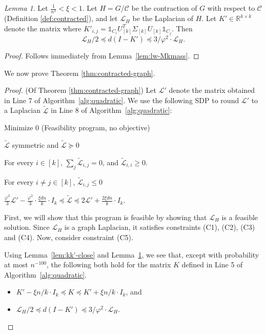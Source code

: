 \documentclass[letterpaper,11pt]{article}
\newcommand{\cC}{\mathcal{C}}
\newcommand{\cL}{\mathcal{L}}
\newcommand{\R}{\mathbb{R}}
\theoremstyle{plain}
\theoremstyle{definition}
\theoremstyle{remark}
\newtheorem{lemmma}{Lemma}
\newcommand{\wt}[1]{\widetilde{#1}}
\begin{document}
\begin{lemmma} \label{lem:k'-to-lh}
    Let $\frac{1}{n^4}<\xi<1$. Let $H=G/\cC$  be the contraction of $G$ with respect to $\cC$ (Definition \ref{def:contracted}), and let $\mathcal{L}_H$ be the Laplacian of $H$. Let $K' \in \R^{k \times k}$ denote the matrix where $K'_{i,j} = \mathds{1}_{C_i} U_{[k]}^T \Sigma_{[k]} U_{[k]} \mathds{1}_{C_j}$. Then $$\cL_H/2 \preceq d(I - K') \preceq 3/\varphi^2 \cdot \cL_H.$$
\end{lemmma}
\begin{proof} Follows immediately from Lemma~\ref{lem:lw-Mkmass}.
\end{proof}


We now prove Theorem \ref{thm:contracted-graph}.

\begin{proof} (Of Theorem \ref{thm:contracted-graph}) Let $\mathcal{L}'$ denote the matrix obtained in Line 7 of Algorithm~\ref{alg:quadratic}. 
We use the following SDP to round $\mathcal{L}'$ to a Laplacian $\widetilde{\mathcal{L}}$ in Line 8 of Algorithm~\ref{alg:quadratic}:
\begin{condenum}[label=(C\arabic*)., ref=(C\arabic*)]
	\item Minimize $0$ (Feasibility program, no objective)
	\item $\wt{\cL}$ symmetric and $\wt{\cL} \succeq 0$
    \item For every $i \in [k]$, $\sum_j \widetilde{\cL}_{i,j} = 0$, and $\widetilde{\cL}_{i,i} \geq 0$.
	\item For every $i \neq j \in [k]$, $\widetilde{\cL}_{i,j} \leq 0$
	\item $	\frac{\varphi^2}{3} \cL' - \frac{\varphi^2}{3} \cdot \frac{\xi dn}{k} \cdot I_k \preceq \wt{\cL} \preceq 2 \cL' + \frac{2 \xi dn}{k} \cdot I_k $. 
\end{condenum}	   

First, we will show that this program is feasible by showing that $\mathcal{L}_H$ is a feasible solution. Since $\mathcal{L}_H$ is a graph Laplacian, it satisfies constraints (C1), (C2), (C3) and (C4). Now, consider constraint (C5). 

Using Lemma~\ref{lem:kk'-close} and Lemma~\ref{lem:k'-to-lh}, we see that, except with probability at most $n^{-100}$, the following both hold for the matrix $K$ defined in Line 5 of Algorithm~\ref{alg:quadratic}.

\begin{itemize}
    \item $K' - \xi n/k \cdot I_k \preceq K \preceq K' + \xi n/k \cdot I_k $, and
    \item $\cL_H/2 \preceq d(I - K') \preceq 3/\varphi^2 \cdot \cL_H$.
\end{itemize}


\end{proof}
\end{document}
